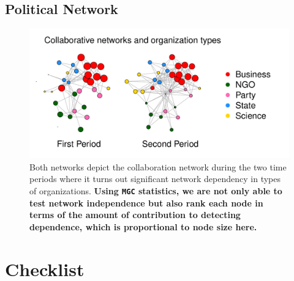 \documentclass[12pt]{article}
\begin{document}
\subsection*{Political Network}

\begin{figure}[H]
	\centering
		\includegraphics[width=\linewidth]{../Figure/two_politics.pdf}
	\caption{Both networks depict the collaboration network during the two time periods where it turns out significant network dependency in types of organizations. \textbf{Using \texttt{MGC} statistics, we are not only able to test network independence but also rank each node in terms of the amount of contribution to detecting dependence, which is proportional to node size here.}}
	\label{fig:politics}
\end{figure}

\newpage
\section{Checklist}
\end{document}

